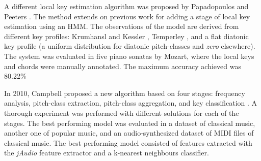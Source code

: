 

A different local key estimation algorithm was proposed by
Papadopoulos and Peeters \cite{papadopoulos2009local}. The
method extends on previous work
\cite{papadopoulos2008simultaneous} for adding a stage of
local key estimation using an HMM. The observations of the
model are derived from different key profiles: Krumhansl and
Kessler \cite{krumhansl1982tracing}, Temperley
\cite{temperley1999whats}, and a flat diatonic key profile
(a uniform distribution for diatonic pitch-classes and
\emph{zero} elsewhere). The system was evaluated in five
piano sonatas by Mozart, where the local keys and chords
were manually annotated. The maximum accuracy achieved was
80.22\%

In 2010, Campbell proposed a new algorithm based on four
stages: frequency analysis, pitch-class extraction,
pitch-class aggregation, and key classification
\cite{campbell2010automatic}. A thorough experiment was
performed with different solutions for each of the stages.
The best performing model was evaluated in a dataset of
classical music, another one of popular music, and an
audio-synthesized dataset of MIDI files of classical music.
The best performing model consisted of features extracted
with the \emph{jAudio} feature extractor and a k-nearest
neighbours classifier.

